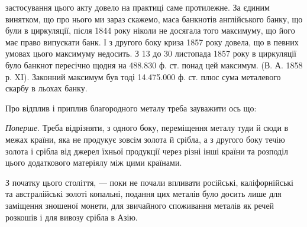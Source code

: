 \parcont{}  %
застосування цього акту довело на практиці саме протилежне. За єдиним винятком,
що про нього ми зараз скажемо, маса банкнотів англійського банку,
що були в циркуляції, після 1844 року ніколи не досягала того максимуму, що
його має право випускати банк. І з другого боку криза 1857 року довела, що
в певних умовах цього максимуму недосить. З 13 до 30 листопада 1857 року
в циркуляції було банкнот пересічно щодня на 488.830 ф. ст. понад цей
максимум. (В. А. 1858 р. XI). Законний максимум був тоді 14.475.000 ф. ст.
плюс сума металевого скарбу в льохах банку.

Про відплив і приплив благородного металу треба зауважити ось що:

\emph{Поперше}. Треба відрізняти, з одного боку, переміщення металу туди
й сюди в межах країни, яка не продукує зовсім золота й срібла, а з другого
боку течію золота і срібла від джерел їхньої продукції через різні інші країни
та розподіл цього додаткового матеріялу між цими країнами.

З початку цього століття, — поки не почали впливати російські, каліфорнійські
та австралійські золоті копальні, подання цих металів було досить лише
для заміщення зношеної монети, для звичайного споживання металів як речей
розкошів і для вивозу срібла в Азію.

